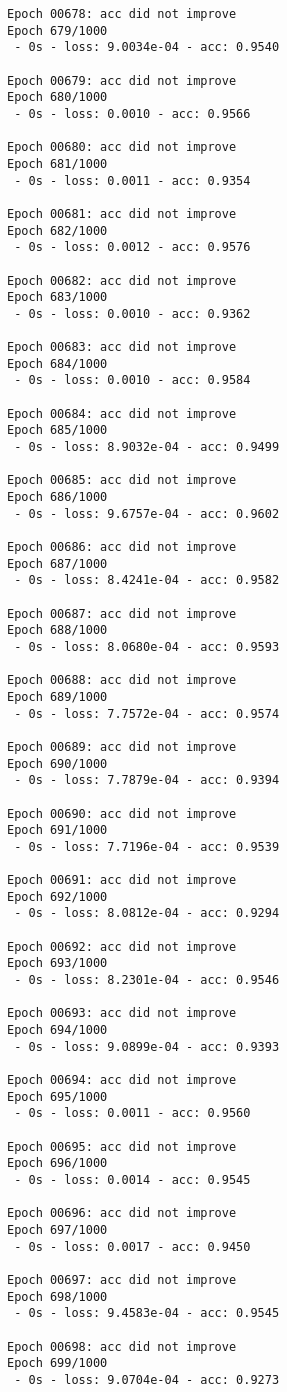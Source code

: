 \documentclass[11pt]{article}
\begin{document}
\begin{Verbatim}[commandchars=\\\{\}]
Epoch 00678: acc did not improve
Epoch 679/1000
 - 0s - loss: 9.0034e-04 - acc: 0.9540

Epoch 00679: acc did not improve
Epoch 680/1000
 - 0s - loss: 0.0010 - acc: 0.9566

Epoch 00680: acc did not improve
Epoch 681/1000
 - 0s - loss: 0.0011 - acc: 0.9354

Epoch 00681: acc did not improve
Epoch 682/1000
 - 0s - loss: 0.0012 - acc: 0.9576

Epoch 00682: acc did not improve
Epoch 683/1000
 - 0s - loss: 0.0010 - acc: 0.9362

Epoch 00683: acc did not improve
Epoch 684/1000
 - 0s - loss: 0.0010 - acc: 0.9584

Epoch 00684: acc did not improve
Epoch 685/1000
 - 0s - loss: 8.9032e-04 - acc: 0.9499

Epoch 00685: acc did not improve
Epoch 686/1000
 - 0s - loss: 9.6757e-04 - acc: 0.9602

Epoch 00686: acc did not improve
Epoch 687/1000
 - 0s - loss: 8.4241e-04 - acc: 0.9582

Epoch 00687: acc did not improve
Epoch 688/1000
 - 0s - loss: 8.0680e-04 - acc: 0.9593

Epoch 00688: acc did not improve
Epoch 689/1000
 - 0s - loss: 7.7572e-04 - acc: 0.9574

Epoch 00689: acc did not improve
Epoch 690/1000
 - 0s - loss: 7.7879e-04 - acc: 0.9394

Epoch 00690: acc did not improve
Epoch 691/1000
 - 0s - loss: 7.7196e-04 - acc: 0.9539

Epoch 00691: acc did not improve
Epoch 692/1000
 - 0s - loss: 8.0812e-04 - acc: 0.9294

Epoch 00692: acc did not improve
Epoch 693/1000
 - 0s - loss: 8.2301e-04 - acc: 0.9546

Epoch 00693: acc did not improve
Epoch 694/1000
 - 0s - loss: 9.0899e-04 - acc: 0.9393

Epoch 00694: acc did not improve
Epoch 695/1000
 - 0s - loss: 0.0011 - acc: 0.9560

Epoch 00695: acc did not improve
Epoch 696/1000
 - 0s - loss: 0.0014 - acc: 0.9545

Epoch 00696: acc did not improve
Epoch 697/1000
 - 0s - loss: 0.0017 - acc: 0.9450

Epoch 00697: acc did not improve
Epoch 698/1000
 - 0s - loss: 9.4583e-04 - acc: 0.9545

Epoch 00698: acc did not improve
Epoch 699/1000
 - 0s - loss: 9.0704e-04 - acc: 0.9273


\end{Verbatim}
\end{document}
